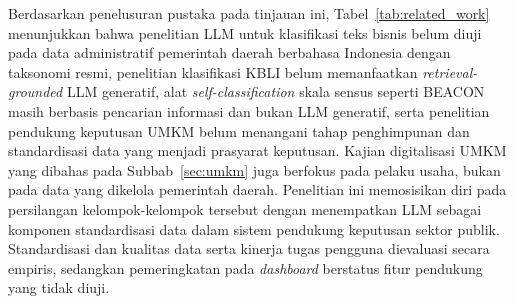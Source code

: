 Berdasarkan penelusuran pustaka pada tinjauan ini, Tabel~\ref{tab:related_work} menunjukkan bahwa penelitian LLM untuk klasifikasi teks bisnis belum diuji pada data administratif pemerintah daerah berbahasa Indonesia dengan taksonomi resmi, penelitian klasifikasi KBLI belum memanfaatkan \textit{retrieval-grounded} LLM generatif, alat \textit{self-classification} skala sensus seperti BEACON masih berbasis pencarian informasi dan bukan LLM generatif, serta penelitian pendukung keputusan UMKM belum menangani tahap penghimpunan dan standardisasi data yang menjadi prasyarat keputusan. Kajian digitalisasi UMKM yang dibahas pada Subbab~\ref{sec:umkm} juga berfokus pada pelaku usaha, bukan pada data yang dikelola pemerintah daerah. Penelitian ini memosisikan diri pada persilangan kelompok-kelompok tersebut dengan menempatkan LLM sebagai komponen standardisasi data dalam sistem pendukung keputusan sektor publik. Standardisasi dan kualitas data serta kinerja tugas pengguna dievaluasi secara empiris, sedangkan pemeringkatan pada \textit{dashboard} berstatus fitur pendukung yang tidak diuji.